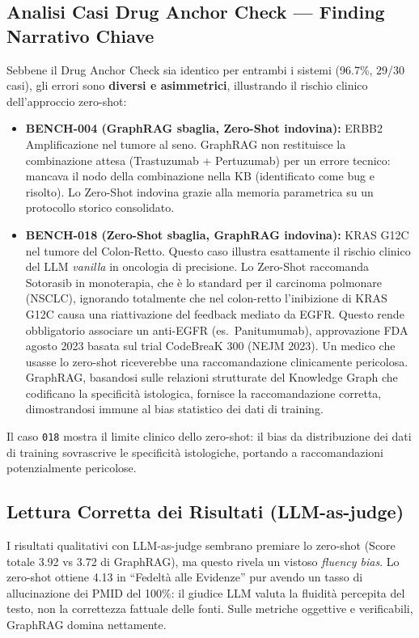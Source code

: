 \documentclass[11pt,a4paper]{article}
\newcommand{\bench}[1]{\texttt{\small #1}}
\begin{document}
\subsection{Analisi Casi Drug Anchor Check --- Finding Narrativo Chiave}
Sebbene il Drug Anchor Check sia identico per entrambi i sistemi (96.7\%, 29/30 casi), gli errori sono \textbf{diversi e asimmetrici}, illustrando il rischio clinico dell'approccio zero-shot:
\begin{itemize}
\item \textbf{BENCH-004 (GraphRAG sbaglia, Zero-Shot indovina):} ERBB2 Amplificazione nel tumore al seno. GraphRAG non restituisce la combinazione attesa (Trastuzumab + Pertuzumab) per un errore tecnico: mancava il nodo della combinazione nella KB (identificato come bug e risolto). Lo Zero-Shot indovina grazie alla memoria parametrica su un protocollo storico consolidato.
\item \textbf{BENCH-018 (Zero-Shot sbaglia, GraphRAG indovina):} KRAS G12C nel tumore del Colon-Retto. Questo caso illustra esattamente il rischio clinico del LLM \emph{vanilla} in oncologia di precisione. Lo Zero-Shot raccomanda Sotorasib in monoterapia, che \`e lo standard per il carcinoma polmonare (NSCLC), ignorando totalmente che nel colon-retto l'inibizione di KRAS G12C causa una riattivazione del feedback mediato da EGFR. Questo rende obbligatorio associare un anti-EGFR (es.\ Panitumumab), approvazione FDA agosto 2023 basata sul trial CodeBreaK 300 (NEJM 2023). Un medico che usasse lo zero-shot riceverebbe una raccomandazione clinicamente pericolosa. GraphRAG, basandosi sulle relazioni strutturate del Knowledge Graph che codificano la specificit\`a istologica, fornisce la raccomandazione corretta, dimostrandosi immune al bias statistico dei dati di training.
\end{itemize}
Il caso \bench{018} mostra il limite clinico dello zero-shot: il bias da distribuzione dei dati di training sovrascrive le specificit\`a istologiche, portando a raccomandazioni potenzialmente pericolose.

\subsection{Lettura Corretta dei Risultati (LLM-as-judge)}
I risultati qualitativi con LLM-as-judge sembrano premiare lo zero-shot (Score totale 3.92 vs 3.72 di GraphRAG), ma questo rivela un vistoso \emph{fluency bias}. Lo zero-shot ottiene 4.13 in ``Fedelt\`a alle Evidenze'' pur avendo un tasso di allucinazione dei PMID del 100\%: il giudice LLM valuta la fluidit\`a percepita del testo, non la correttezza fattuale delle fonti. Sulle metriche oggettive e verificabili, GraphRAG domina nettamente.
\end{document}
